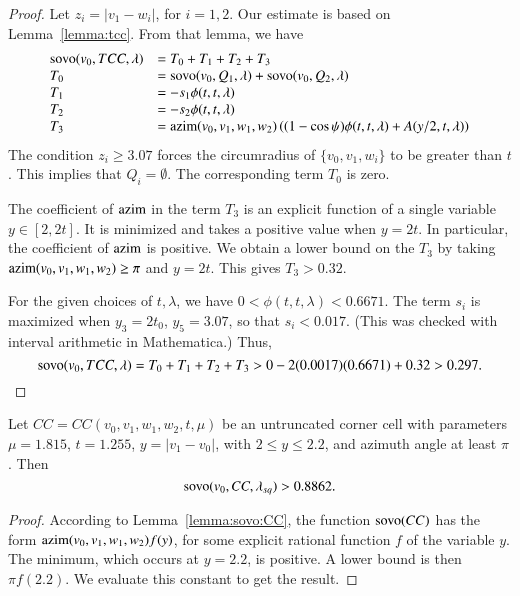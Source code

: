\begin{proof}
Let $z_i = |v_1-w_i|$, for $i=1,2$.
Our estimate is based on Lemma~\ref{lemma:tcc}.  From that lemma,
we have
  $$
  \begin{array}{lll}
  {\operatorname{sovo}}(v_0,TCC,\lambda) &= T_0 + T_1 + T_2 + T_3 \\
  T_0 &= {\operatorname{sovo}}(v_0,Q_1,\lambda) +  {\operatorname{sovo}}(v_0,Q_2,\lambda)\\
  T_1  &=  - s_1\phi(t,t,\lambda) \\
  T_2  &= - s_2\phi(t,t,\lambda) \\
  T_3 &= 
  {\operatorname{azim}}(v_0,v_1,w_1,w_2) \left((1-\cos\psi)\phi(t,t,\lambda)+
    A(y/2,t,\lambda)\right) \\
  \end{array}
  $$
The condition $z_i\ge3.07$
forces the circumradius of $\{v_0,v_1,w_i\}$ to be greater
than $t$.  This implies that $Q_i=\emptyset$.  The corresponding
term $T_0$ is zero.

The coefficient of ${\operatorname{azim}}$ in the term $T_3$
is an explicit function of a single variable $y\in[2,2t]$.
It is minimized and takes a positive value
when $y=2t$.
In particular,
the coefficient of ${\operatorname{azim}}$ is
positive. We obtain a lower bound on the $T_3$ by taking
${\operatorname{azim}}(v_0,v_1,w_1,w_2)\ge \pi$ and $y=2t$.
This gives $T_3 > 0.32$.

For the given choices of $t,\lambda$, we have
$0 < \phi(t,t,\lambda) < 0.6671$.  The term $s_i$ is
maximized when $y_3=2t_0$, $y_5=3.07$,
so that $s_i < 0.017$.  (This was checked with interval arithmetic in
Mathematica.) Thus,
    $${\operatorname{sovo}}(v_0,TCC,\lambda)  = T_0 + T_1 + T_2 + T_3 >
   0 - 2 (0.0017)(0.6671) +0.32 > 0.297.$$
\end{proof}



\begin{lemma}\label{lemma:CC815}  
Let $CC=CC(v_0,v_1,w_1,w_2,t,\mu)$
be an untruncated corner
cell with parameters $\mu=1.815$, $t=1.255$,
$y=|v_1-v_0|$, with $2\le y\le 2.2$, 
and azimuth angle at least $\pi$.  Then
 $${\operatorname{sovo}}(v_0,CC,\lambda_{sq}) > 0.8862.$$ %
\end{lemma}


\begin{proof}  According to Lemma~\ref{lemma:sovo:CC},
the function ${\operatorname{sovo}}(CC)$ has the form
${\operatorname{azim}}(v_0,v_1,w_1,w_2) f(y)$, for
some explicit rational function $f$ of the
variable $y$. 
The minimum, which occurs at $y=2.2$, is positive.
A lower bound is then $\pi f(2.2)$. 
We evaluate this constant to get the result.
\end{proof}




